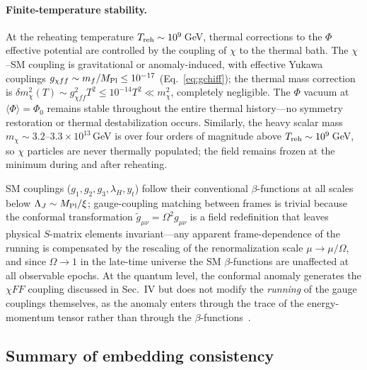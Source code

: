 \documentclass[pdflatex,sn-mathphys-num]{sn-jnl}
\newcommand{\MP}{M_{\rm Pl}}
\newcommand{\PhiV}{\Phi_0}
\newcommand{\vev}[1]{\langle #1\rangle}
\theoremstyle{thmstyleone}
\begin{document}
\paragraph{Finite-temperature stability.} At the reheating temperature $T_{\rm reh}\sim10^9\,$GeV, thermal corrections to the $\Phi$ effective potential are controlled by the coupling of $\chi$ to the thermal bath. The $\chi$--SM coupling is gravitational or anomaly-induced, with effective Yukawa couplings $g_{\chi ff}\sim m_f/\MP\leq10^{-17}$ (Eq.~\eqref{eq:gchiff}); the thermal mass correction is $\delta m_\chi^2(T)\sim g_{\chi ff}^2 T^2\leq10^{-14}T^2\ll m_\chi^2$, completely negligible. The $\Phi$ vacuum at $\vev{\Phi}=\PhiV$ remains stable throughout the entire thermal history---no symmetry restoration or thermal destabilization occurs. Similarly, the heavy scalar mass $m_\chi\sim3.2$--$3.3\times10^{13}\,$GeV is over four orders of magnitude above $T_{\rm reh}\sim10^9\,$GeV, so $\chi$ particles are never thermally populated; the field remains frozen at the minimum during and after reheating.

SM couplings ($g_1,g_2,g_3,\lambda_H,y_t$) follow their conventional $\beta$-functions at all scales below $\Lambda_J\sim\MP/\xi$; gauge-coupling matching between frames is trivial because the conformal transformation $\tilde g_{\mu\nu}=\Omega^2 g_{\mu\nu}$ is a field redefinition that leaves physical $S$-matrix elements invariant---any apparent frame-dependence of the running is compensated by the rescaling of the renormalization scale $\mu\to\mu/\Omega$, and since $\Omega\to1$ in the late-time universe the SM $\beta$-functions are unaffected at all observable epochs. At the quantum level, the conformal anomaly generates the $\chi FF$ coupling discussed in Sec.~IV but does not modify the \emph{running} of the gauge couplings themselves, as the anomaly enters through the trace of the energy-momentum tensor rather than through the $\beta$-functions~\cite{BirrellDavies}.

\subsection{Summary of embedding consistency}
\end{document}
